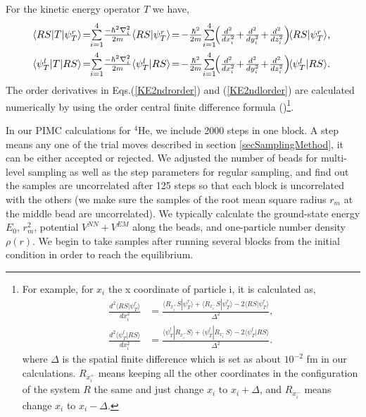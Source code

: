 \documentclass[12pt,letterpaper,UTF8]{report}
\begin{document}
For the kinetic energy operator $T$ we have,
\begin{align}
\resizebox{.87222\hsize}{!}{ $
\!\!\!\langle R S| T | \psi^r_T \rangle \!=\!\!\sum \limits_{i=1}^4 \! \frac{-\hbar^2\nabla_i^2}{2m}
\langle R S | \psi^r_T \rangle
\!=\! -\frac{\hbar^2}{2m} \!\sum \limits_{i=1}^4 \!\! \left( \frac{d^2 }{dx_i^2} \!+\! \frac{d^2 }{dy_i^2} \!+\! \frac{d^2 }{dz_i^2} \right) \!\!
\langle R S | \psi^r_T \rangle$,}
\label{KE2ndrorder} \\
\resizebox{.87222\hsize}{!}{ $
\!\!\!\langle \psi^l_T  | T | R S \rangle \!=\!\!\sum \limits_{i=1}^4\! \frac{-\hbar^2\nabla_i^2}{2m}
\langle \psi^l_T | RS \rangle
\!=\! -\frac{\hbar^2}{2m} \!\sum \limits_{i=1}^4\!\! \left( \frac{d^2 }{dx_i^2} \!+\! \frac{d^2 }{dy_i^2} \!+\! \frac{d^2 }{dz_i^2} \right) \!\!
\langle \psi^l_T | RS \rangle .$}
\label{KE2ndlorder}
\end{align}
The  order derivatives in Eqs.(\ref{KE2ndrorder}) and (\ref{KE2ndlorder}) are calculated numerically by using the  order central finite difference formula (\cite{Fornberg88a})\footnote{For example, for $x_i$ the x coordinate of particle i, it is calculated as,
\begin{align}
\frac{d^2 \langle R S | \psi^r_T \rangle }{d x_i^2}  &=
\frac{  \langle R_{x_i^+} S | \psi^r_T \rangle
\! + \! \langle R_{x_i^-} S | \psi^r_T \rangle
\! - \! 2 \langle R S | \psi^r_T \rangle    }{\Delta^2}, \\
\frac{d^2 \langle \psi^l_T  | RS \rangle }{d x_i^2}  &=
\frac{  \langle \psi^l_T  | R_{x_i^+} S \rangle
\! + \! \langle \psi^l_T  |  R_{x_i^-} S  \rangle
\! - \! 2 \langle \psi^l_T  | RS \rangle    }{\Delta^2} .
\end{align}
where $\Delta$ is the spatial finite difference which is set as about $10^{-2}$ fm in our calculations. $R_{x_i^+}$ means keeping all the other coordinates in the configuration of the system $R$ the same and just change $x_i$ to $x_i+\Delta$, and $R_{x_i^-}$ means change $x_i$ to $x_i-\Delta$.}.

In our PIMC calculations for $^4$He, we include 2000 steps in one block.
A step means any one of the trial moves described in section \ref{secSamplingMethod}, it can be either accepted or rejected.
We adjusted the number of beads for multi-level sampling as well as the step parameters for regular sampling, and find out the samples are uncorrelated after 125 steps so that each block is uncorrelated with the others (we make sure the samples of the root mean square radius $r_m$ at the middle bead are uncorrelated). We typically calculate the ground-state energy $E_0$, $r_m^2$, potential $V^{NN}+V^{EM}$ along the beads, and one-particle number density $\rho(r)$. We begin to take samples after running several blocks from the initial condition in order to reach the equilibrium.
\end{document}
